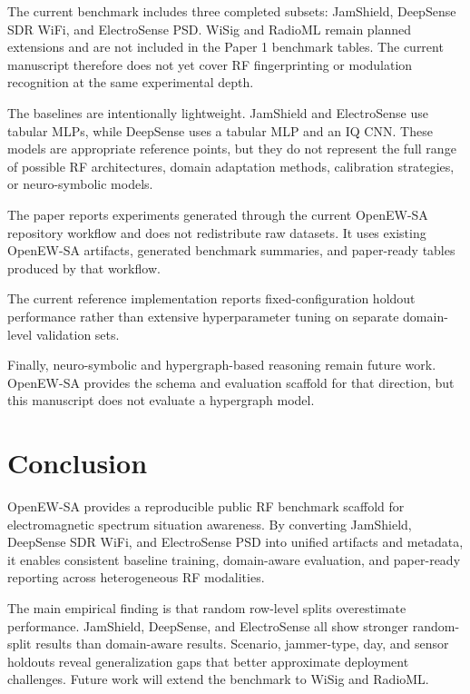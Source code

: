 \documentclass{ieeeaccess}
\begin{document}
The current benchmark includes three completed subsets: JamShield, DeepSense SDR WiFi, and ElectroSense PSD. WiSig and RadioML remain planned extensions and are not included in the Paper 1 benchmark tables. The current manuscript therefore does not yet cover RF fingerprinting \cite{hanna2022wisig,coreslab2022wisigDataset} or modulation recognition \cite{oshea2016convolutionalRadioModulation,deepsig2016radioml2016a} at the same experimental depth.

The baselines are intentionally lightweight. JamShield and ElectroSense use tabular MLPs, while DeepSense uses a tabular MLP and an IQ CNN. These models are appropriate reference points, but they do not represent the full range of possible RF architectures, domain adaptation methods, calibration strategies, or neuro-symbolic models.

The paper reports experiments generated through the current OpenEW-SA repository workflow and does not redistribute raw datasets. It uses existing OpenEW-SA artifacts, generated benchmark summaries, and paper-ready tables produced by that workflow.

The current reference implementation reports fixed-configuration holdout performance rather than extensive hyperparameter tuning on separate domain-level validation sets.

Finally, neuro-symbolic and hypergraph-based reasoning remain future work. OpenEW-SA provides the schema and evaluation scaffold for that direction, but this manuscript does not evaluate a hypergraph model.

\section{Conclusion}

OpenEW-SA provides a reproducible public RF benchmark scaffold for electromagnetic spectrum situation awareness. By converting JamShield, DeepSense SDR WiFi, and ElectroSense PSD into unified artifacts and metadata, it enables consistent baseline training, domain-aware evaluation, and paper-ready reporting across heterogeneous RF modalities.

The main empirical finding is that random row-level splits overestimate performance. JamShield, DeepSense, and ElectroSense all show stronger random-split results than domain-aware results. Scenario, jammer-type, day, and sensor holdouts reveal generalization gaps that better approximate deployment challenges. Future work will extend the benchmark to WiSig and RadioML.
\end{document}
